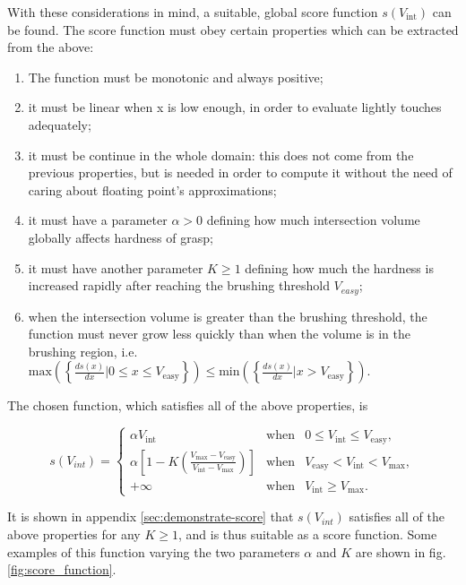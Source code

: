 With these considerations in mind, a suitable, global score function $s(V_{\text{int}})$
can be found. The score function must obey certain properties which can be
extracted from the above:

\begin{enumerate}
  \item{The function must be monotonic and always positive;}
  \item{it must be linear when x is low enough, in order to evaluate
    lightly touches adequately;}
  \item{it must be continue in the whole domain: this does not come
      from the previous properties, but is needed in order to compute it without
    the need of caring about floating point's approximations;}
  \item{it must have a parameter $\alpha>0$ defining how much
    intersection volume globally affects hardness of grasp;}
  \item{it must have another parameter $K\geq1$ defining how much the hardness is
    increased rapidly after reaching the brushing threshold $V_{easy}$;}
  \item{when the intersection volume is greater than the brushing threshold, the
      function
    must never grow less quickly than when the volume is in the brushing
    region, i.e. $\text{max}\left( \left\{ \frac{ds(x)}{dx} | 0 \leq
    x \leq V_{\text{easy}} \right\} \right) \leq \text{min}\left( \left\{
  \frac{ds(x)}{dx} | x > V_{\text{easy}}\right\} \right)$.}
\end{enumerate}

The chosen function, which satisfies all of the above properties, is

\begin{equation} \label{eqn:score-function}
  s(V_{int})=\left\{
    \begin{array}{lcr}
      \alpha V_{\text{int}} & \text{when} & 0 \leq V_{\text{int}} \leq V_{\text{easy}}, \\
      \alpha
      \left[1-K\left(\frac{V_{\text{max}}-V_{\text{easy}}}{V_{\text{int}}-V_{\text{max}}}\right)\right]
      & \text{when} &  V_{\text{easy}} < V_{\text{int}} < V_{\text{max}}, \\
      +\infty & \text{when} & V_{\text{int}} \geq V_{\text{max}}.
    \end{array}
  \right.
\end{equation}

It is shown in appendix \ref{sec:demonstrate-score} that $s(V_{int})$ satisfies all
of the above properties for any $K\geq1$, and is thus suitable as a score
function. Some examples of this function varying the two parameters $\alpha$ and
$K$ are shown in fig. \ref{fig:score_function}.

